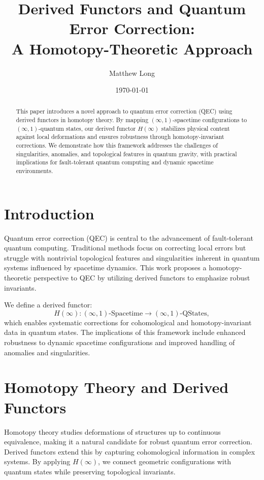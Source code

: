 \documentclass[11pt]{article}
\title{Derived Functors and Quantum Error Correction:\\
A Homotopy-Theoretic Approach}
\author{Matthew Long}
\date{\today}
\begin{document}
\maketitle

\begin{abstract}
This paper introduces a novel approach to quantum error correction (QEC) using derived functors in homotopy theory. By mapping \((\infty,1)\)-spacetime configurations to \((\infty,1)\)-quantum states, our derived functor \( H(\infty) \) stabilizes physical content against local deformations and ensures robustness through homotopy-invariant corrections. We demonstrate how this framework addresses the challenges of singularities, anomalies, and topological features in quantum gravity, with practical implications for fault-tolerant quantum computing and dynamic spacetime environments.
\end{abstract}

\section{Introduction}
Quantum error correction (QEC) is central to the advancement of fault-tolerant quantum computing. Traditional methods focus on correcting local errors but struggle with nontrivial topological features and singularities inherent in quantum systems influenced by spacetime dynamics. This work proposes a homotopy-theoretic perspective to QEC by utilizing derived functors to emphasize robust invariants.

We define a derived functor:
\[
H(\infty): (\infty,1)\text{-Spacetime} \to (\infty,1)\text{-QStates},
\]
which enables systematic corrections for cohomological and homotopy-invariant data in quantum states. The implications of this framework include enhanced robustness to dynamic spacetime configurations and improved handling of anomalies and singularities.

\section{Homotopy Theory and Derived Functors}
Homotopy theory studies deformations of structures up to continuous equivalence, making it a natural candidate for robust quantum error correction. Derived functors extend this by capturing cohomological information in complex systems. By applying \( H(\infty) \), we connect geometric configurations with quantum states while preserving topological invariants.
\end{document}
